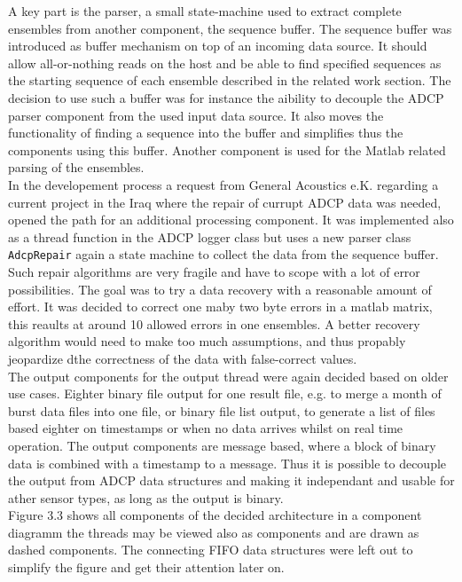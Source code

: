 A key part is the parser, a small state-machine used to extract complete ensembles from another component, the sequence buffer. The sequence buffer was introduced as buffer mechanism on top of an incoming data source. It should allow all-or-nothing reads on the host and be able to find specified sequences as the starting sequence of each ensemble described in the related work section. The decision to use such a buffer was for instance the aibility to decouple the ADCP parser component from the used input data source. It also moves the functionality of finding a sequence into the buffer and simplifies thus the components using this buffer. Another component is used for the Matlab related parsing of the ensembles.\\ In the developement process a request from General Acoustics e.K. regarding a current project in the Iraq where the repair of currupt ADCP data was needed, opened the path for an additional processing component. It was implemented also as a thread function in the ADCP logger class but uses a new parser class \texttt{AdcpRepair} again a state machine to collect the data from the sequence buffer. Such repair algorithms are very fragile and have to scope with a lot of error possibilities. The goal was to try a data recovery with a reasonable amount of effort. It was decided to correct one maby two byte errors in a matlab matrix, this reaults at around 10 allowed errors in one ensembles. A better recovery algorithm would need to make too much assumptions, and thus propably jeopardize dthe correctness of the data with false-correct values.\\
The output components for the output thread were again decided based on older use cases. Eighter binary file output for one result file, e.g. to merge a month of burst data files into one file, or binary file list output, to generate a list of files based eighter on timestamps or when no data arrives whilst on real time operation. The output components are message based, where a block of binary data is combined with a timestamp to a message. Thus it is possible to decouple the output from ADCP data structures and making it independant and usable for ather sensor types, as long as the output is binary.\\
Figure 3.3 shows all components of the decided architecture in a component diagramm the threads may be viewed also as components and are drawn as dashed components. The connecting FIFO data structures were left out to simplify the figure and get their attention later on.\\ 
